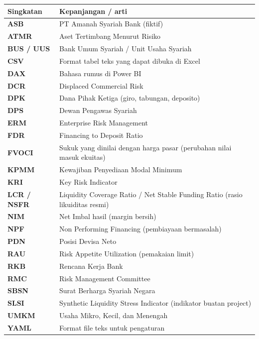 \documentclass[11pt,a4paper]{article}
\begin{document}
\begin{longtable}{>{\bfseries}p{2.6cm}>{\raggedright\arraybackslash}p{12.2cm}}
\toprule
Singkatan & Kepanjangan / arti \\
\midrule
\endhead
ASB & PT Amanah Syariah Bank (fiktif) \\
ATMR & Aset Tertimbang Menurut Risiko \\
BUS / UUS & Bank Umum Syariah / Unit Usaha Syariah \\
CSV & Format tabel teks yang dapat dibuka di Excel \\
DAX & Bahasa rumus di Power BI \\
DCR & Displaced Commercial Risk \\
DPK & Dana Pihak Ketiga (giro, tabungan, deposito) \\
DPS & Dewan Pengawas Syariah \\
ERM & Enterprise Risk Management \\
FDR & Financing to Deposit Ratio \\
FVOCI & Sukuk yang dinilai dengan harga pasar (perubahan nilai masuk ekuitas) \\
KPMM & Kewajiban Penyediaan Modal Minimum \\
KRI & Key Risk Indicator \\
LCR / NSFR & Liquidity Coverage Ratio / Net Stable Funding Ratio (rasio likuiditas resmi) \\
NIM & Net Imbal hasil (margin bersih) \\
NPF & Non Performing Financing (pembiayaan bermasalah) \\
PDN & Posisi Devisa Neto \\
RAU & Risk Appetite Utilization (pemakaian limit) \\
RKB & Rencana Kerja Bank \\
RMC & Risk Management Committee \\
SBSN & Surat Berharga Syariah Negara \\
SLSI & Synthetic Liquidity Stress Indicator (indikator buatan project) \\
UMKM & Usaha Mikro, Kecil, dan Menengah \\
YAML & Format file teks untuk pengaturan \\
\bottomrule
\end{longtable}
\end{document}
